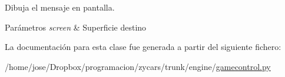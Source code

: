 \-Dibuja el mensaje en pantalla. 


\begin{DoxyParams}{\-Parámetros}
{\em screen} & \-Superficie destino \\
\hline
\end{DoxyParams}


\-La documentación para esta clase fue generada a partir del siguiente fichero\-:\begin{DoxyCompactItemize}
\item 
/home/jose/\-Dropbox/programacion/zycars/trunk/engine/\hyperlink{gamecontrol_8py}{gamecontrol.\-py}\end{DoxyCompactItemize}
